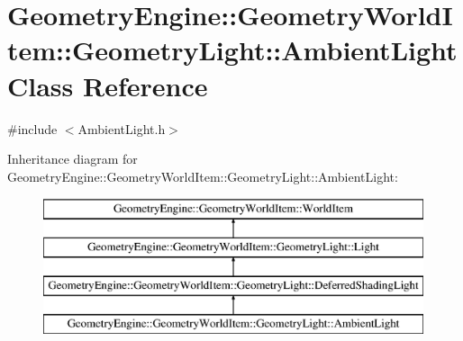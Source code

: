 \hypertarget{class_geometry_engine_1_1_geometry_world_item_1_1_geometry_light_1_1_ambient_light}{}\section{Geometry\+Engine\+::Geometry\+World\+Item\+::Geometry\+Light\+::Ambient\+Light Class Reference}
\label{class_geometry_engine_1_1_geometry_world_item_1_1_geometry_light_1_1_ambient_light}


{\ttfamily \#include $<$Ambient\+Light.\+h$>$}

Inheritance diagram for Geometry\+Engine\+::Geometry\+World\+Item\+::Geometry\+Light\+::Ambient\+Light\+:\begin{figure}[H]
\begin{center}
\leavevmode
\includegraphics[height=4.000000cm]{class_geometry_engine_1_1_geometry_world_item_1_1_geometry_light_1_1_ambient_light}
\end{center}
\end{figure}
